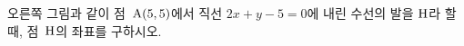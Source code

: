 \noindent\begin{minipage}[t]{0.58\linewidth}\vspace{0pt}\raggedright 오른쪽 그림과 같이 점~$\mathrm{A}(5{,}\mkern3mu\mathopen{}5)$에서 직선 $2x+y-5=0$에 내린 수선의 발을 $\mathrm{H}$라 할 때, 점~$\mathrm{H}$의 좌표를 구하시오.\end{minipage}\hfill\begin{minipage}[t]{0.4\linewidth}\vspace{0pt}\centering \resizebox{\ifdim\width>\linewidth\linewidth\else\width\fi}{!}{}\end{minipage}\par
